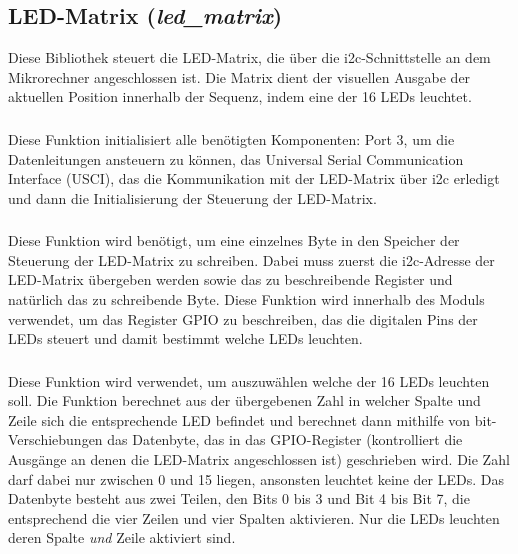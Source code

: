 \subsection{LED-Matrix (\emph{led\_matrix})}
Diese Bibliothek steuert die LED-Matrix, die über die i2c-Schnittstelle an dem Mikrorechner angeschlossen ist. Die Matrix dient der visuellen Ausgabe der aktuellen Position innerhalb der Sequenz, indem eine der 16 LEDs leuchtet.

\subsubsection{}
Diese Funktion initialisiert alle benötigten Komponenten: Port 3, um die Datenleitungen ansteuern zu können, das Universal Serial Communication Interface (USCI), das die Kommunikation mit der LED-Matrix über i2c erledigt und dann die Initialisierung der Steuerung der LED-Matrix.

\subsubsection{}
Diese Funktion wird benötigt, um eine einzelnes Byte in den Speicher der Steuerung der LED-Matrix zu schreiben. Dabei muss zuerst die i2c-Adresse der LED-Matrix übergeben werden sowie das zu beschreibende Register und natürlich das zu schreibende Byte. Diese Funktion wird innerhalb des Moduls verwendet, um das Register GPIO zu beschreiben, das die digitalen Pins der LEDs steuert und damit bestimmt welche LEDs leuchten.

\subsubsection{}
Diese Funktion wird verwendet, um auszuwählen welche der 16 LEDs leuchten soll. Die Funktion berechnet aus der übergebenen Zahl in welcher Spalte und Zeile sich die entsprechende LED befindet und berechnet dann mithilfe von bit-Verschiebungen das Datenbyte, das in das GPIO-Register (kontrolliert die Ausgänge an denen die LED-Matrix angeschlossen ist) geschrieben wird. Die Zahl darf dabei nur zwischen 0 und 15 liegen, ansonsten leuchtet keine der LEDs. Das Datenbyte besteht aus zwei Teilen, den Bits 0 bis 3 und Bit 4 bis Bit 7, die entsprechend die vier Zeilen und vier Spalten aktivieren. Nur die LEDs leuchten deren Spalte \emph{und} Zeile aktiviert sind.
